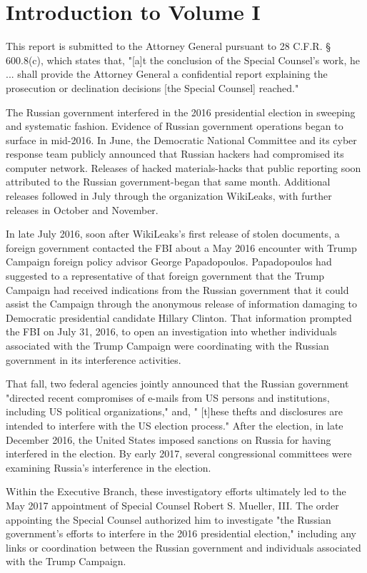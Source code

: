\documentclass{article}
\begin{document}
\tableofcontents
\newpage

\section{Introduction to Volume I}

This report is submitted to the Attorney General pursuant to 28 C.F.R. §  600.8(c), which states that, "[a]t the conclusion of the Special Counsel's work, he ... shall provide the Attorney General a  confidential report explaining the prosecution or declination decisions [the Special Counsel] reached."

The Russian government interfered in the 2016 presidential election in sweeping and systematic fashion. Evidence of Russian government operations began to surface in mid-2016. In June, the Democratic National Committee and its cyber response team publicly announced that Russian hackers had compromised its computer network. Releases of hacked materials-hacks that public reporting soon attributed to the Russian government-began that same month. Additional releases followed in July through the organization WikiLeaks, with further releases in October and November.

In late July 2016, soon after WikiLeaks's first release of stolen documents, a  foreign government contacted the FBI about a May 2016 encounter with Trump Campaign foreign policy advisor George Papadopoulos. Papadopoulos had suggested to a  representative of that foreign government that the Trump Campaign had received indications from the Russian government that it could assist the Campaign through the anonymous release of information damaging to Democratic presidential candidate Hillary Clinton. That information prompted the FBI on July 31, 2016, to open an investigation into whether individuals associated with the Trump Campaign were coordinating with the Russian government in its interference activities.

That fall, two federal agencies jointly announced that the Russian government "directed recent compromises of e-mails from US persons and institutions, including US political organizations," and, " [t]hese thefts and disclosures are intended to interfere with the US election process." After the election, in late December 2016, the United States imposed sanctions on Russia for having interfered in the election. By early 2017, several congressional committees were examining Russia's interference in the election.

Within the Executive Branch, these investigatory efforts ultimately led to the May 2017 appointment of Special Counsel Robert S. Mueller, III. The order appointing the Special Counsel authorized him to investigate "the Russian government's efforts to interfere in the 2016 presidential election,"  including any links or coordination between the Russian government and individuals associated with the Trump Campaign.
\end{document}
